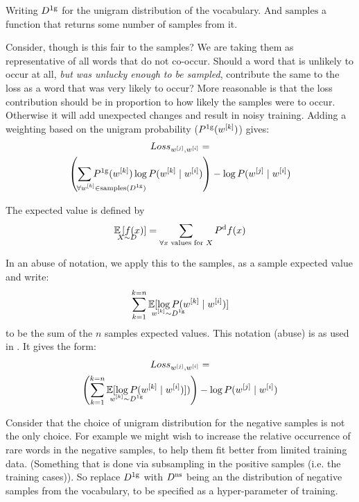 \documentclass[parskip]{komatufte}
\begin{document}
Writing $\d D_{1g}$ for the unigram distribution of the vocabulary.
And $\text{samples}$ a function that returns some number of samples from it.

Consider, though is this fair to the samples?
We are taking them as representative of all words that do not co-occur.
Should a word that is unlikely to occur at all, \emph{but was unlucky enough to be sampled}, contribute the same to the loss as a word that was very likely to occur?
More reasonable is that the loss contribution should be in proportion to how likely the samples were to occur.
Otherwise it will add unexpected changes and result in noisy training.
Adding a weighting based on the unigram probability ($\d P_{1g}(\n w_k)$) gives:
%
\begin{multline}
Loss_{\n w_j,\n w_i} = \\
\left(\sum_{\mathrlap{\!\!\!\!\!\!\forall \n w_k \in \text{samples}(\d D_{1g})}}
\d P_{1g}(\n w_k) \log P(\n w_k\mid \n w_i) \right)
-\log P(\n w_j\mid \n w_i)
\end{multline}


The expected value is defined by
\begin{equation}
\expected_{X \sim D} \left[ f(x) \right]= \sum_{\text{$\forall x$ values for $X$}} \d P_d f(x)
\end{equation}

In an abuse of notation, we apply this to the samples, as a sample expected value and write:
\begin{equation}
	\sum_{k=1}^{k=n} \expected_{\n w_k \sim \d D_{1g}} [\log P(\n w_k\mid \n w_i)]
\end{equation}
to be the sum of the $n$ samples expected values.
This notation (abuse) is as used in .
It gives the form:
\begin{multline}
Loss_{\n w_j,\n w_i} = \\
\left(\sum_{k=1}^{k=n} \expected_{\n w_k \sim \d D_{1g}} [\log P(\n w_k\mid \n w_i)]) \right)
-\log P(\n w_j\mid \n w_i)
\end{multline}

Consider that the choice of unigram distribution for the negative samples is not the only choice.
For example we might wish to increase the relative occurrence of rare words in the negative samples, to help them fit better from limited training data.
(Something that is done via subsampling in the positive samples (i.e. the training cases)).
So replace $\d D_{1g}$ with $\d D_{ns}$ being an the distribution of negative samples from the vocabulary,
to be specified as a hyper-parameter of training.
\end{document}
